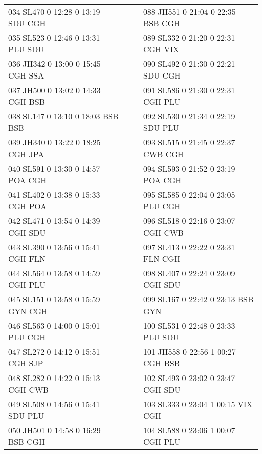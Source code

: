 \begin{scriptsize}
\begin{longtable}{l c c l}
034 SL470  0 12:28 0 13:19 SDU CGH & & & 088 JH551  0 21:04 0 22:35 BSB CGH \\

035 SL523  0 12:46 0 13:31 PLU SDU & & & 089 SL332  0 21:20 0 22:31 CGH VIX \\

036 JH342  0 13:00 0 15:45 CGH SSA & & & 090 SL492  0 21:30 0 22:21 SDU CGH \\

037 JH500  0 13:02 0 14:33 CGH BSB & & & 091 SL586  0 21:30 0 22:31 CGH PLU \\

038 SL147  0 13:10 0 18:03 BSB BSB & & & 092 SL530  0 21:34 0 22:19 SDU PLU \\

039 JH340  0 13:22 0 18:25 CGH JPA & & & 093 SL515  0 21:45 0 22:37 CWB CGH \\

040 SL591  0 13:30 0 14:57 POA CGH & & & 094 SL593  0 21:52 0 23:19 POA CGH \\

041 SL402  0 13:38 0 15:33 CGH POA & & & 095 SL585  0 22:04 0 23:05 PLU CGH \\

042 SL471  0 13:54 0 14:39 CGH SDU & & & 096 SL518  0 22:16 0 23:07 CGH CWB \\

043 SL390  0 13:56 0 15:41 CGH FLN & & & 097 SL413  0 22:22 0 23:31 FLN CGH \\

044 SL564  0 13:58 0 14:59 CGH PLU & & & 098 SL407  0 22:24 0 23:09 CGH SDU \\

045 SL151  0 13:58 0 15:59 GYN CGH & & & 099 SL167  0 22:42 0 23:13 BSB GYN \\

046 SL563  0 14:00 0 15:01 PLU CGH & & & 100 SL531  0 22:48 0 23:33 PLU SDU \\

047 SL272  0 14:12 0 15:51 CGH SJP & & & 101 JH558  0 22:56 1 00:27 CGH BSB \\

048 SL282  0 14:22 0 15:13 CGH CWB & & & 102 SL493  0 23:02 0 23:47 CGH SDU \\

049 SL508  0 14:56 0 15:41 SDU PLU & & & 103 SL333  0 23:04 1 00:15 VIX CGH \\

050 JH501  0 14:58 0 16:29 BSB CGH & & & 104 SL588  0 23:06 1 00:07 CGH PLU \\


\end{longtable}
\end{scriptsize}
